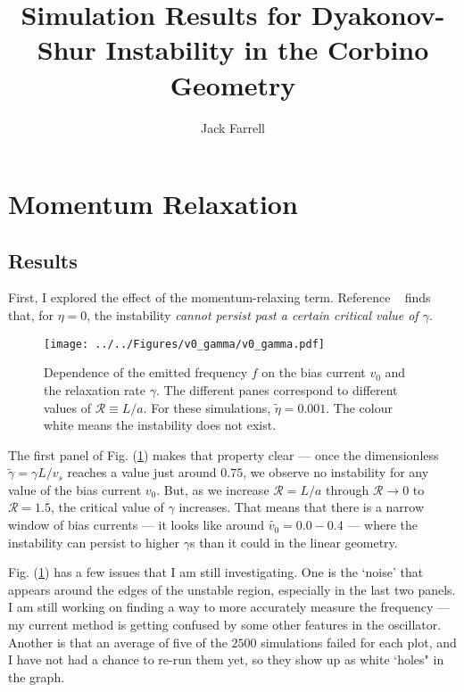 \documentclass[12pt]{article}
\title{Simulation Results for Dyakonov-Shur Instability in the Corbino Geometry}
\author{Jack Farrell}
\begin{document}
	\maketitle
	
	\section{Momentum Relaxation}
	\label{sec:gamma}
	\subsection{Results}
	First, I explored the effect of the momentum-relaxing term. Reference ~\cite{Mendl2019} finds that, for $\eta = 0$, the instability \emph{cannot persist past a certain critical value of $\gamma$}.  
	
		\begin{figure}[ht]
		\centering
		\texttt{[image: ../../Figures/v0\_gamma/v0\_gamma.pdf]}
		\caption{Dependence of the emitted frequency $f$ on the bias current $v_0$ and the relaxation rate $\gamma$.  The different panes correspond to different values of $\mathcal{R} \equiv L/a$.  For these simulations, $\tilde{\eta} = 0.001$.  The colour white means the instability does not exist.}\label{fig:v0_gamma} 
	\end{figure}

	The first panel of Fig. (\ref{fig:v0_gamma}) makes that property clear --- once the dimensionless $\tilde{\gamma} = \gamma L / v_s$ reaches a value just around $0.75$, we observe no instability for any value of the bias current $v_0$.  But, as we increase $\mathcal{R}=L/a$ through $\mathcal{R} \rightarrow 0$ to $\mathcal{R} = 1.5$, the critical value of $\gamma$ increases.  That means that there is a narrow window of bias currents --- it looks like around $\tilde{v_0} = 0.0 - 0.4$ --- where the instability can persist to higher $\gamma$s than it could in the linear geometry.
	
	Fig. (\ref{fig:v0_gamma}) has a few issues that I am still investigating.  One is the `noise' that appears around the edges of the unstable region, especially in the last two panels.  I am still working on finding a way to more accurately measure the frequency --- my current method is getting confused by some other features in the oscillator.   Another is that an average of five of the $2500$ simulations failed for each plot, and I have not had a chance to re-run them yet, so they show up as white `holes" in the graph.
	
\end{document}

